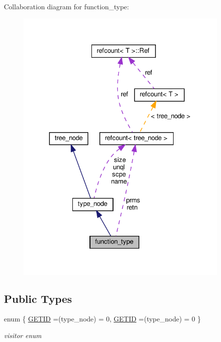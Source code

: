 Collaboration diagram for function\+\_\+type\+:
\nopagebreak
\begin{figure}[H]
\begin{center}
\leavevmode
\includegraphics[width=297pt]{d5/dd3/structfunction__type__coll__graph}
\end{center}
\end{figure}
\subsection*{Public Types}
\begin{DoxyCompactItemize}
\item 
enum \{ \hyperlink{structfunction__type_ad1dd6411d535f0d3b7493f74f4b72b1eaed665a91f2c85dcfd1399d4d54a3d4e1}{G\+E\+T\+ID} =(type\+\_\+node) = 0, 
\hyperlink{structfunction__type_ad1dd6411d535f0d3b7493f74f4b72b1eaed665a91f2c85dcfd1399d4d54a3d4e1}{G\+E\+T\+ID} =(type\+\_\+node) = 0
 \}\begin{DoxyCompactList}\small\item\em visitor enum \end{DoxyCompactList}
\end{DoxyCompactItemize}
